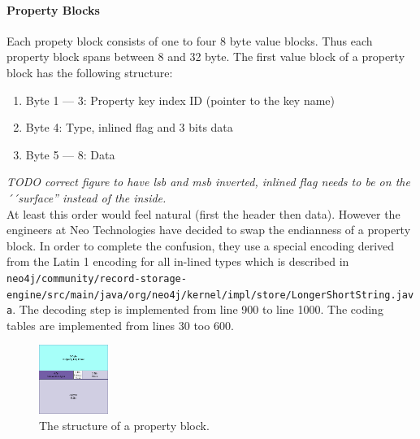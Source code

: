             \paragraph{Property Blocks} 
                Each propety block consists of one to four 8 byte value blocks.
                Thus each property block spans between 8 and 32 byte.
                The first value block of a property block has the following structure:
                \begin{enumerate}
                    \item Byte 1 --- 3: Property key index ID (pointer to the key name)
                    \item Byte 4: Type, inlined flag and 3 bits data
                    \item Byte 5 --- 8: Data
                \end{enumerate}
                \textit{TODO correct figure to have lsb and msb inverted, inlined flag needs to be on the ´´surface'' instead of the inside.} \\
                
                At least this order would feel natural (first the header then data).
                However the engineers at Neo Technologies have decided to swap the endianness of a property block.
                In order to complete the confusion, they use a special encoding derived from the Latin 1 encoding for all in-lined types which is described in \texttt{neo4j/community/record-storage-engine/src/main/java/org/neo4j/kernel/impl/store/LongerShortString.java}.
                The decoding step is implemented from line 900 to line 1000.
                The coding tables are implemented from lines 30 too 600.
                
                \begin{figure}[htp]\label{prop_block}
                    \begin{center}
                        \includegraphics[keepaspectratio,height=0.2\textheight,width=0.2\textwidth]{img/03_record/property/property_block.png}
                    \end{center}
                    \caption{The structure of a property block.} %
                \end{figure}
                

